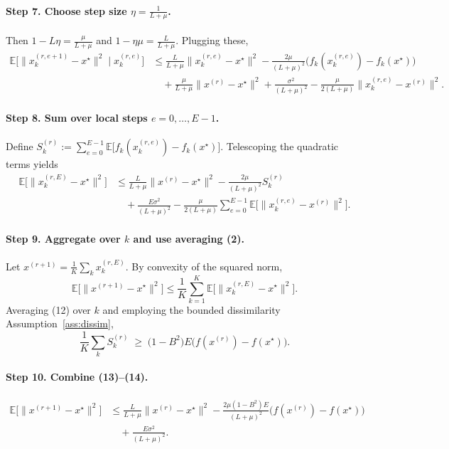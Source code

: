 \documentclass{article}
\newcommand{\E}{\mathbb{E}}
\begin{document}
\paragraph{Step 7. Choose step size $\eta = \frac{1}{L+\mu}$.}  
Then $1-L\eta = \frac{\mu}{L+\mu}$ and $1-\eta\mu = \frac{L}{L+\mu}$. Plugging these,
\[
\begin{aligned}
\E\big[\|x_{k}^{(r,e+1)}-x^\star\|^2\mid x_{k}^{(r,e)}\big]
&\le \frac{L}{L+\mu}\|x_{k}^{(r,e)}-x^\star\|^2
-\frac{2\mu}{(L+\mu)^2}\big(f_k(x_{k}^{(r,e)})-f_k(x^\star)\big) \\
&\quad +\frac{\mu}{L+\mu}\|x^{(r)}-x^\star\|^2
+\frac{\sigma^2}{(L+\mu)^2}
-\frac{\mu}{2(L+\mu)}\|x_{k}^{(r,e)}-x^{(r)}\|^2 .
\end{aligned}
\tag{11}
\]

\paragraph{Step 8. Sum over local steps $e=0,\dots,E-1$.}  
Define $S_k^{(r)}:=\sum_{e=0}^{E-1}\E\big[f_k(x_{k}^{(r,e)})-f_k(x^\star)\big]$. Telescoping the quadratic terms yields
\[
\begin{aligned}
\E\big[\|x_{k}^{(r,E)}-x^\star\|^2\big]
&\le \frac{L}{L+\mu}\|x^{(r)}-x^\star\|^2
-\frac{2\mu}{(L+\mu)^2} S_k^{(r)} \\
&\quad +\frac{E\sigma^2}{(L+\mu)^2}
-\frac{\mu}{2(L+\mu)}\sum_{e=0}^{E-1}\E\big[\|x_{k}^{(r,e)}-x^{(r)}\|^2\big].
\end{aligned}
\tag{12}
\]

\paragraph{Step 9. Aggregate over $k$ and use averaging (2).}  
Let $x^{(r+1)}=\frac1K\sum_k x_{k}^{(r,E)}$. By convexity of the squared norm,
\[
\E\big[\|x^{(r+1)}-x^\star\|^2\big] \le \frac1K\sum_{k=1}^K \E\big[\|x_{k}^{(r,E)}-x^\star\|^2\big].
\tag{13}
\]
Averaging (12) over $k$ and employing the bounded dissimilarity Assumption~\ref{ass:dissim},
\[
\frac{1}{K}\sum_{k} S_k^{(r)} \;\ge\; \big(1-B^2\big)E\big(f(x^{(r)})-f(x^\star)\big).
\tag{14}
\]

\paragraph{Step 10. Combine (13)–(14).}  
\[
\begin{aligned}
\E\big[\|x^{(r+1)}-x^\star\|^2\big]
&\le \frac{L}{L+\mu}\|x^{(r)}-x^\star\|^2
-\frac{2\mu(1-B^2)E}{(L+\mu)^2}\big(f(x^{(r)})-f(x^\star)\big) \\
&\quad +\frac{E\sigma^2}{(L+\mu)^2}.
\end{aligned}
\tag{15}
\]
\end{document}

